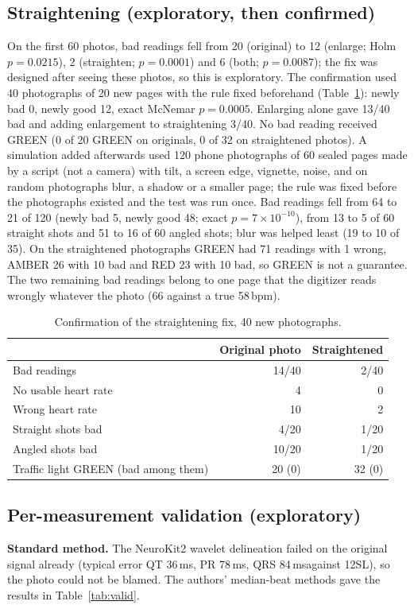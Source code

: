 \documentclass[11pt,a4paper]{article}
\newcommand{\bpm}{\,bpm}
\newcommand{\ms}{\,ms}
\begin{document}
\subsection{Straightening (exploratory, then confirmed)}
On the first 60 photos, bad readings fell from 20 (original) to 12 (enlarge; Holm $p=0.0215$), 2 (straighten; $p=0.0001$) and 6 (both; $p=0.0087$); the fix was designed after seeing these photos, so this is exploratory. The confirmation used 40 photographs of 20 new pages with the rule fixed beforehand (Table~\ref{tab:fix}): newly bad 0, newly good 12, exact McNemar $p=0.0005$. Enlarging alone gave 13/40 bad and adding enlargement to straightening 3/40. No bad reading received GREEN (0 of 20 GREEN on originals, 0 of 32 on straightened photos). A simulation added afterwards used 120 phone photographs of 60 sealed pages made by a script (not a camera) with tilt, a screen edge, vignette, noise, and on random photographs blur, a shadow or a smaller page; the rule was fixed before the photographs existed and the test was run once. Bad readings fell from 64 to 21 of 120 (newly bad 5, newly good 48; exact $p=7\times10^{-10}$), from 13 to 5 of 60 straight shots and 51 to 16 of 60 angled shots; blur was helped least (19 to 10 of 35). On the straightened photographs GREEN had 71 readings with 1 wrong, AMBER 26 with 10 bad and RED 23 with 10 bad, so GREEN is not a guarantee. The two remaining bad readings belong to one page that the digitizer reads wrongly whatever the photo (66 against a true 58\bpm).

\begin{table}[ht]
\caption{Confirmation of the straightening fix, 40 new photographs.}
\label{tab:fix}
\centering\small
\begin{tabular}{lrr}
\toprule
 & Original photo & Straightened \\
\midrule
Bad readings & 14/40 & 2/40 \\
No usable heart rate & 4 & 0 \\
Wrong heart rate & 10 & 2 \\
Straight shots bad & 4/20 & 1/20 \\
Angled shots bad & 10/20 & 1/20 \\
Traffic light GREEN (bad among them) & 20 (0) & 32 (0) \\
\bottomrule
\end{tabular}
\end{table}

\subsection{Per-measurement validation (exploratory)}
\textbf{Standard method.} The NeuroKit2 wavelet delineation failed on the original signal already (typical error QT 36\ms, PR 78\ms, QRS 84\ms against 12SL), so the photo could not be blamed. The authors' median-beat methods gave the results in Table~\ref{tab:valid}.
\end{document}
